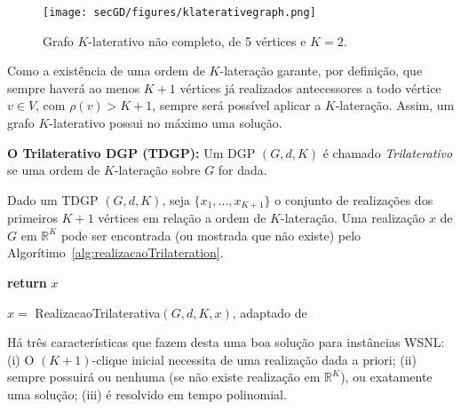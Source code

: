 \begin{figure}[H]
	\begin{center}
		\texttt{[image: secGD/figures/klaterativegraph.png]}
	\end{center}
	\caption{Grafo $K$-laterativo não completo, de 5 vértices e $K = 2$.}
	\label{fig:klaterativegraph}
\end{figure}

Como a existência de uma ordem de $K$-lateração garante, por definição, que sempre haverá ao menos $K+1$ vértices já realizados antecessores a todo vértice $v \in V$, com $\rho(v) > K+1$, sempre será possível aplicar a $K$-lateração. Assim, um grafo $K$-laterativo possui no máximo uma solução.

\begin{center}
	\begin{minipage}{0.93 \linewidth}
		\textbf{O Trilaterativo DGP (TDGP):} Um DGP $(G,d,K)$ é chamado \textit{Trilaterativo} se uma ordem de $K$-lateração sobre $G$ for dada.
	\end{minipage}
\end{center}

Dado um TDGP $(G,d,K)$, seja $\{x_1, \dots,x_{K+1}\}$ o conjunto de realizações dos primeiros $K+1$ vértices em relação a ordem de $K$-lateração. Uma realização $x$ de $G$ em $\mathbb{R}^K$ pode ser encontrada (ou mostrada que não existe) pelo Algorítimo~\ref{alg:realizacaoTrilateration}.
\\

\begin{algorithm}[H]
	\label{alg:realizacaoTrilateration}
	\textbf{return} $x$\;
	\caption{$x =$ RealizacaoTrilaterativa$(G,d, K, x)$, adaptado de \cite{libertiEDG}}
\end{algorithm}
\vspace{0.4cm}

Há três características que fazem desta uma boa solução para instâncias WSNL: (i) O $(K+1)$-clique inicial necessita de uma realização dada a priori; (ii) sempre possuirá ou nenhuma (se não existe realização em $\mathbb{R}^K$), ou exatamente uma solução; (iii) é resolvido em tempo polinomial.

